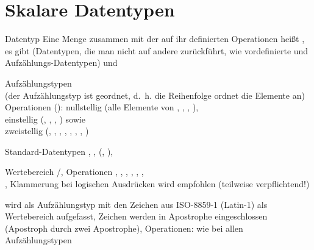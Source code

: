 \section{%
    Skalare Datentypen%
}

\begin{Def}{Datentyp}
    Eine Menge zusammen mit der auf ihr definierten Operationen heißt
    , es gibt  (Datentypen, die man nicht
    auf andere zurückführt, wie vordefinierte und Aufzählungs-Datentypen) und
\end{Def}

\begin{Def}{Aufzählungstypen}
     \\
    (der Aufzählungstyp ist geordnet, d.~h. die Reihenfolge ordnet die Elemente
    an) \\
    Operationen (): nullstellig (alle Elemente von
    , , , ), \\
    einstellig (, ,
    , ) sowie \\
    zweistellig (\adacode{=}, \adacode{/=}, \adacode{<}, \adacode{<=},
    \adacode{>}, \adacode{>=}, , )
\end{Def}

\begin{Def}{Standard-Datentypen}
    ,
    ,
     (, ),
\end{Def}

\begin{Def}{}
    Wertebereich /,
    Operationen , , , ,
    \adacode{=}, ,\\
    ,
    Klammerung bei logischen Ausdrücken wird empfohlen
    (teilweise verpflichtend!)
\end{Def}

\begin{Def}{}
    wird als Aufzählungstyp mit den Zeichen aus ISO-8859-1 (Latin-1)
    als Wertebereich aufgefasst, Zeichen werden in Apostrophe eingeschlossen
    (Apostroph durch zwei Apostrophe),
    Operationen: wie bei allen Aufzählungstypen
\end{Def}

